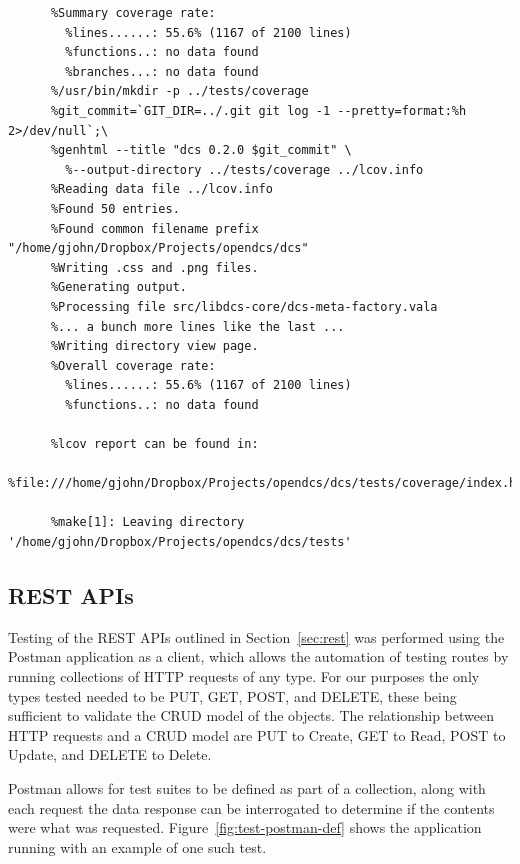     \begin{lstlisting}[caption={Coverage Summary},
                       label={lst:test-cov-summary}]
      %Writing data to ../lcov.info
      %Summary coverage rate:
        %lines......: 55.6% (1167 of 2100 lines)
        %functions..: no data found
        %branches...: no data found
      %/usr/bin/mkdir -p ../tests/coverage
      %git_commit=`GIT_DIR=../.git git log -1 --pretty=format:%h 2>/dev/null`;\
      %genhtml --title "dcs 0.2.0 $git_commit" \
        %--output-directory ../tests/coverage ../lcov.info
      %Reading data file ../lcov.info
      %Found 50 entries.
      %Found common filename prefix "/home/gjohn/Dropbox/Projects/opendcs/dcs"
      %Writing .css and .png files.
      %Generating output.
      %Processing file src/libdcs-core/dcs-meta-factory.vala
      %... a bunch more lines like the last ...
      %Writing directory view page.
      %Overall coverage rate:
        %lines......: 55.6% (1167 of 2100 lines)
        %functions..: no data found

      %lcov report can be found in:
      %file:///home/gjohn/Dropbox/Projects/opendcs/dcs/tests/coverage/index.html

      %make[1]: Leaving directory '/home/gjohn/Dropbox/Projects/opendcs/dcs/tests'
    \end{lstlisting}

  \subsection{REST APIs}\label{sec:test-rest}

    Testing of the REST APIs outlined in Section~\ref{sec:rest} was performed
    using the Postman application as a client, which allows the automation of
    testing routes by running collections of HTTP requests of any type. For our
    purposes the only types tested needed to be PUT, GET, POST, and DELETE,
    these being sufficient to validate the CRUD model of the objects. The
     relationship between HTTP requests and a CRUD model are PUT to Create, GET
    to Read, POST to Update, and DELETE to Delete.

    Postman allows for test suites to be defined as part of a collection, along
    with each request the data response can be interrogated to determine if the
    contents were what was requested. Figure~\ref{fig:test-postman-def} shows
    the application running with an example of one such test.

